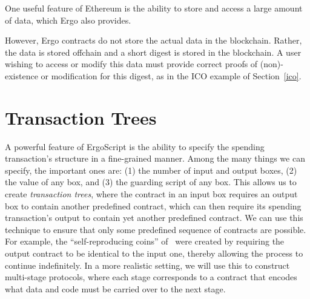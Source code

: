 \documentclass[runningheads]{llncs}
\newcommand{\langname}{ErgoScript\xspace}
\begin{document}
 
 One useful feature of Ethereum is the ability to store and access a large amount of data, which Ergo also provides.
 
 However, Ergo contracts do not store the actual data in the blockchain. Rather, the data is stored offchain and a short digest is stored in the blockchain. A user wishing to access or modify this data must provide correct proofs of (non)-existence or modification for this digest, as in the ICO example of Section~\ref{ico}. 

\section{Transaction Trees}
A powerful feature of \langname is the ability to specify the spending transaction's structure in a fine-grained manner. 
Among the many things we can specify, the important ones are: (1) the number of input and output boxes, (2) the value of any box, and (3) the guarding script of any box. This allows us to create {\em transaction trees}, where the contract in an input box requires an output box to contain another predefined contract, which can then require its spending transaction's output to contain yet another predefined contract. We can use this technique to ensure that only some predefined sequence of contracts are possible. For example, the ``self-reproducing coins'' of~\cite{CKM18a} were created by requiring the output contract to be identical to the input one, thereby allowing the process to continue indefinitely. In a more realistic setting, we will use this to construct multi-stage protocols, where each stage corresponds to a contract that encodes what data and code must be carried over to the next stage. 
\end{document}
